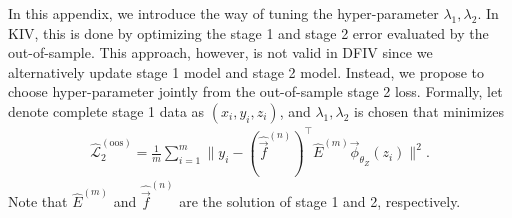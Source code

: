 In this appendix, we introduce the way of tuning the hyper-parameter $\lambda_1, \lambda_2$. In KIV, this is done by optimizing the stage 1 and stage 2 error evaluated by the out-of-sample. This approach, however, is not valid in DFIV since we alternatively update stage 1 model and stage 2 model. Instead, we propose to choose hyper-parameter jointly from the out-of-sample stage 2 loss. Formally, let denote complete stage 1 data as $(x_i, y_i, z_i)$, and $\lambda_1, \lambda_2$ is chosen that minimizes
\begin{align*}
    \hat{\mathcal{L}}_2^{(\mathrm{oos})} = \frac{1}{m} \sum_{i=1}^m \|y_i - (\hat{\vec{f}}^{(n)})^\top \hat{E}^{(m)} \vec{\phi}_{\theta_Z}(z_i)\|^2.
\end{align*}
Note that $\hat{E}^{(m)}$ and $\hat{\vec{f}}^{(n)}$ are the solution of stage 1 and 2, respectively.
